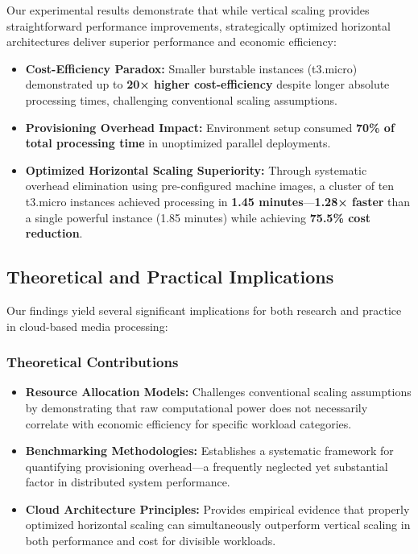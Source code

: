 \documentclass[conference]{IEEEtran}
\begin{document}
	Our experimental results demonstrate that while vertical scaling provides straightforward performance improvements, strategically optimized horizontal architectures deliver superior performance and economic efficiency:
	
	\begin{itemize}
		\item \textbf{Cost-Efficiency Paradox:} Smaller burstable instances (t3.micro) demonstrated up to \textbf{20× higher cost-efficiency} despite longer absolute processing times, challenging conventional scaling assumptions.
		
		\item \textbf{Provisioning Overhead Impact:} Environment setup consumed \textbf{70\% of total processing time} in unoptimized parallel deployments.
		
		\item \textbf{Optimized Horizontal Scaling Superiority:} Through systematic overhead elimination using pre-configured machine images, a cluster of ten t3.micro instances achieved processing in \textbf{1.45 minutes}—\textbf{1.28× faster} than a single powerful instance (1.85 minutes) while achieving \textbf{75.5\% cost reduction}.
	\end{itemize}
	
	\subsection{Theoretical and Practical Implications}
	
	Our findings yield several significant implications for both research and practice in cloud-based media processing:
	
	\subsubsection{Theoretical Contributions}
	\begin{itemize}
		\item \textbf{Resource Allocation Models:} Challenges conventional scaling assumptions by demonstrating that raw computational power does not necessarily correlate with economic efficiency for specific workload categories.
		\item \textbf{Benchmarking Methodologies:} Establishes a systematic framework for quantifying provisioning overhead—a frequently neglected yet substantial factor in distributed system performance.
		\item \textbf{Cloud Architecture Principles:} Provides empirical evidence that properly optimized horizontal scaling can simultaneously outperform vertical scaling in both performance and cost for divisible workloads.
	\end{itemize}
	
\end{document}
